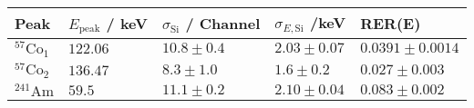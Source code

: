 	\begin{tabular}{|p{2cm}|p{2.5cm}|p{3cm}|p{3cm}|p{3cm}|}
		\hline
		\rowcolor{tabcolor}
		Peak   & $E_\mathrm{peak}$ / keV & $\sigma_\mathrm{Si}$ / Channel &             $\sigma_{E, \mathrm{Si}}$ /keV & RER(E) \\ 
		\hline
		$^{57}\mathrm{Co}_1$ & $122.06$ & $10.8 \pm 0.4$ & $2.03 \pm 0.07$ & $0.0391 \pm 0.0014$\\ 
		$^{57}\mathrm{Co}_2$ & $136.47$ & $8.3 \pm 1.0$ & $1.6 \pm 0.2$ & $0.027 \pm 0.003$\\ 
		$^{241}\mathrm{Am}$ & $59.5$ & $11.1 \pm 0.2$ & $2.10 \pm 0.04$ & $0.083 \pm 0.002$\\ 
		\hline
	\end{tabular}
